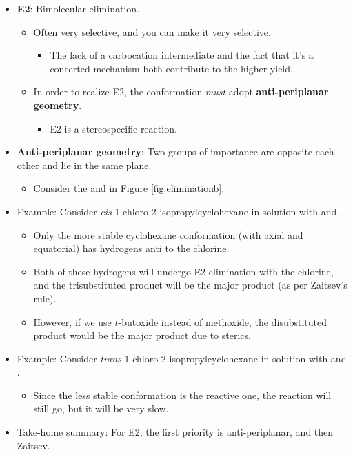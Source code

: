 \documentclass[../notes.tex]{subfiles}
\begin{document}
\begin{itemize}
\begin{itemize}
    \end{itemize}
    \item \textbf{E2}: Bimolecular elimination.
    \begin{itemize}
        \item Often very selective, and you can make it very selective.
        \begin{itemize}
            \item The lack of a carbocation intermediate and the fact that it's a concerted mechanism both contribute to the higher yield.
        \end{itemize}
        \item In order to realize E2, the conformation \emph{must} adopt \textbf{anti-periplanar geometry}.
        \begin{itemize}
            \item E2 is a stereospecific reaction.
        \end{itemize}
    \end{itemize}
    \item \textbf{Anti-periplanar geometry}: Two groups of importance are opposite each other and lie in the same plane.
    \begin{itemize}
        \item Consider the  and  in Figure \ref{fig:eliminationb}.
    \end{itemize}
    \item Example: Consider \emph{cis}-1-chloro-2-isopropylcyclohexane in solution with  and .
    \begin{itemize}
        \item Only the more stable cyclohexane conformation (with  axial and  equatorial) has hydrogens anti to the chlorine.
        \item Both of these hydrogens will undergo E2 elimination with the chlorine, and the trisubstituted product will be the major product (as per Zaitsev's rule).
        \item However, if we use $t$-butoxide instead of methoxide, the disubstituted product would be the major product due to sterics.
    \end{itemize}
    \item Example: Consider \emph{trans}-1-chloro-2-isopropylcyclohexane in solution with  and .
    \begin{itemize}
        \item Since the less stable conformation is the reactive one, the reaction will still go, but it will be very slow.
    \end{itemize}
    \item Take-home summary: For E2, the first priority is anti-periplanar, and then Zaitsev.
\end{itemize}
\end{document}

